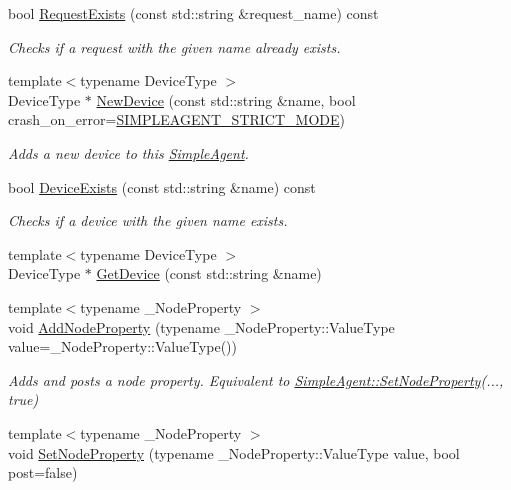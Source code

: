 \begin{DoxyCompactItemize}
bool \hyperlink{classcubesat_1_1SimpleAgent_a7e192cc7fea9421f191ef764ebe0433c}{Request\+Exists} (const std\+::string \&request\+\_\+name) const
\begin{DoxyCompactList}\small\item\em Checks if a request with the given name already exists. \end{DoxyCompactList}\item 
{\footnotesize template$<$typename Device\+Type $>$ }\\Device\+Type $\ast$ \hyperlink{classcubesat_1_1SimpleAgent_a17c459d98ae8266de47ce2b71d321de0}{New\+Device} (const std\+::string \&name, bool crash\+\_\+on\+\_\+error=\hyperlink{SimpleAgent_8h_ae0458b189260d62b7f199e0324dc3cc4}{S\+I\+M\+P\+L\+E\+A\+G\+E\+N\+T\+\_\+\+S\+T\+R\+I\+C\+T\+\_\+\+M\+O\+DE})
\begin{DoxyCompactList}\small\item\em Adds a new device to this \hyperlink{classcubesat_1_1SimpleAgent}{Simple\+Agent}. \end{DoxyCompactList}\item 
bool \hyperlink{classcubesat_1_1SimpleAgent_ae542ebdf5093584a4172a6576cc0972d}{Device\+Exists} (const std\+::string \&name) const
\begin{DoxyCompactList}\small\item\em Checks if a device with the given name exists. \end{DoxyCompactList}\item 
{\footnotesize template$<$typename Device\+Type $>$ }\\Device\+Type $\ast$ \hyperlink{classcubesat_1_1SimpleAgent_a9ff584add8f93a0e135bf6a486ddad2b}{Get\+Device} (const std\+::string \&name)
\item 
{\footnotesize template$<$typename \+\_\+\+Node\+Property $>$ }\\void \hyperlink{classcubesat_1_1SimpleAgent_a6de3323c3325a7bf8739b06d33d03043}{Add\+Node\+Property} (typename \+\_\+\+Node\+Property\+::\+Value\+Type value=\+\_\+\+Node\+Property\+::\+Value\+Type())
\begin{DoxyCompactList}\small\item\em Adds and posts a node property. Equivalent to \hyperlink{classcubesat_1_1SimpleAgent_a42fdb89f78e67399925764a75ccc015c}{Simple\+Agent\+::\+Set\+Node\+Property}(..., true) \end{DoxyCompactList}\item 
{\footnotesize template$<$typename \+\_\+\+Node\+Property $>$ }\\void \hyperlink{classcubesat_1_1SimpleAgent_a42fdb89f78e67399925764a75ccc015c}{Set\+Node\+Property} (typename \+\_\+\+Node\+Property\+::\+Value\+Type value, bool post=false)

\end{DoxyCompactItemize}
